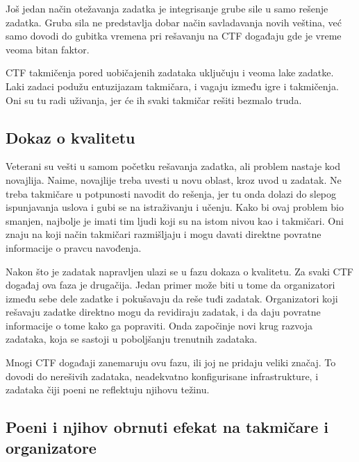 \documentclass[12pt, a4paper, twocolumn]{article}
\begin{document}
Još jedan način otežavanja zadatka je integrisanje grube sile u samo rešenje
zadatka. Gruba sila ne predstavlja dobar način savladavanja novih veština,
već samo dovodi do gubitka vremena pri rešavanju na CTF događaju gde je 
vreme veoma bitan faktor.

CTF takmičenja pored uobičajenih zadataka uključuju i veoma lake zadatke.
Laki zadaci podužu entuzijazam takmičara, i vagaju između igre i takmičenja. 
Oni su tu radi uživanja, jer će ih svaki takmičar rešiti bezmalo truda.

\subsection{Dokaz o kvalitetu}

Veterani su vešti u samom početku rešavanja zadatka, ali problem nastaje kod 
novajlija. Naime, novajlije treba uvesti u novu oblast, kroz uvod u zadatak. 
Ne treba takmičare u potpunosti navodit do rešenja, jer tu onda dolazi do 
slepog ispunjavanja uslova i gubi se na istraživanju i učenju. Kako bi ovaj 
problem bio smanjen, najbolje je imati tim ljudi koji su na istom nivou kao i 
takmičari. Oni znaju na koji način takmičari razmišljaju i mogu davati 
direktne povratne informacije o pravcu navođenja. 

Nakon što je zadatak napravljen ulazi se u fazu dokaza o kvalitetu. Za
svaki CTF događaj ova faza je drugačija. Jedan primer može biti u tome
da organizatori između sebe dele zadatke i pokušavaju da reše tuđi zadatak.
Organizatori koji rešavaju zadatke direktno mogu da revidiraju zadatak, i
da daju povratne informacije o tome kako ga popraviti. Onda započinje novi
krug razvoja zadataka, koja se sastoji u poboljšanju trenutnih zadataka.

Mnogi CTF događaji zanemaruju ovu fazu, ili joj ne pridaju veliki značaj.
To dovodi do nerešivih zadataka, neadekvatno konfigurisane infrastrukture,
i zadataka čiji poeni ne reflektuju njihovu težinu.

\subsection{Poeni i njihov obrnuti efekat na takmičare i organizatore}
\end{document}
